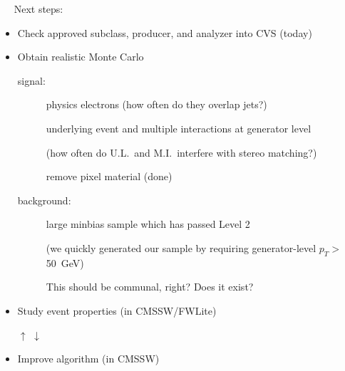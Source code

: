 \documentclass[landscape]{article}
\newenvironment{slide}[1][ ]{\mbox{\bf #1 } \vfill}{\vfill \mbox{ } \hfill \Large \arabic{page} \pagebreak}
\begin{document}
\begin{slide}
Next steps:

\vspace{0.75 cm}
\begin{itemize}

\item Check approved subclass, producer, and analyzer into CVS (today)

\item Obtain realistic Monte Carlo

\begin{center}
\begin{minipage}{0.95\linewidth}
\begin{description}

\item[signal:] physics electrons (how often do they overlap jets?)

underlying event and multiple interactions at generator level

(how often do U.L.\ and M.I.\ interfere with stereo matching?)

remove pixel material (done)

\item[background:] large minbias sample which has passed Level 2

(we quickly generated our sample by requiring generator-level \mbox{\hspace{3 cm}} \hfill $p_T >$ 50~GeV)

This should be communal, right?  Does it exist?

\end{description}
\end{minipage}
\end{center}

\item Study event properties (in CMSSW/FWLite)

\hspace{4.5 cm} $\uparrow$ \hspace{0.5 cm} $\downarrow$

\item Improve algorithm (in CMSSW)

\end{itemize}
\end{slide}
\end{document}
